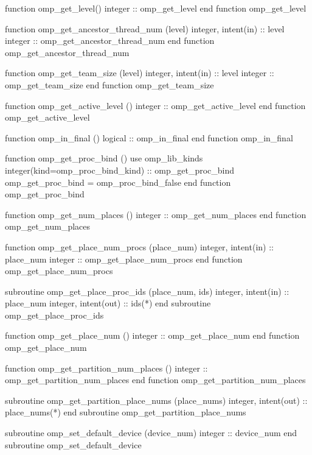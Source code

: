 {{\begin{codepar}
          function omp\_get\_level()
           integer :: omp\_get\_level
          end function omp\_get\_level

          function omp\_get\_ancestor\_thread\_num (level)
           integer, intent(in) :: level
           integer :: omp\_get\_ancestor\_thread\_num
          end function omp\_get\_ancestor\_thread\_num

          function omp\_get\_team\_size (level)
           integer, intent(in) :: level
           integer :: omp\_get\_team\_size
          end function omp\_get\_team\_size

          function omp\_get\_active\_level ()
           integer :: omp\_get\_active\_level
          end function omp\_get\_active\_level

          function omp\_in\_final ()
           logical :: omp\_in\_final
          end function omp\_in\_final

          function omp\_get\_proc\_bind ()
           use omp\_lib\_kinds
           integer(kind=omp\_proc\_bind\_kind) :: omp\_get\_proc\_bind
           omp\_get\_proc\_bind = omp\_proc\_bind\_false
          end function omp\_get\_proc\_bind

          function omp\_get\_num\_places ()
          integer :: omp\_get\_num\_places
          end function omp\_get\_num\_places

          function omp\_get\_place\_num\_procs (place\_num)
          integer, intent(in) :: place\_num
          integer :: omp\_get\_place\_num\_procs
          end function omp\_get\_place\_num\_procs

          subroutine omp\_get\_place\_proc\_ids (place\_num, ids)
          integer, intent(in) :: place\_num
          integer, intent(out) :: ids(*)
          end subroutine omp\_get\_place\_proc\_ids

          function omp\_get\_place\_num ()
          integer :: omp\_get\_place\_num
          end function omp\_get\_place\_num

          function omp\_get\_partition\_num\_places ()
          integer :: omp\_get\_partition\_num\_places
          end function omp\_get\_partition\_num\_places

          subroutine omp\_get\_partition\_place\_nums (place\_nums)
          integer, intent(out) :: place\_nums(*)
          end subroutine omp\_get\_partition\_place\_nums

          subroutine omp\_set\_default\_device (device\_num)
           integer :: device\_num
          end subroutine omp\_set\_default\_device


\end{codepar}}}
